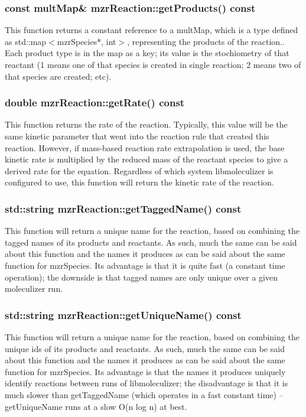 \subsubsection{const multMap\& mzrReaction::getProducts() const}
This function returns a constant reference to a multMap, which is a
type defined as std::map$<$mzrSpecies*, int$>$, representing the products
of the reaction..  Each product type is in
the map as a key; its value is the stochiometry of that reactant (1
means one of that species is created in single reaction; 2 means two
of that species are created; etc).  

\subsubsection{double mzrReaction::getRate() const }
This function returns the rate of the reaction.  Typically, this
value will be the same kinetic parameter that went into the reaction
rule that created this reaction.  However, if mass-based reaction rate
extrapolation is used, the base kinetic rate is multiplied by the
reduced mass of the reactant species to give a derived rate for the
equation.  Regardless of which system libmoleculizer is configured to
use, this function will return the kinetic rate of the reaction.


\subsubsection{std::string mzrReaction::getTaggedName() const}
This function will return a unique name for the reaction, based on
combining the tagged names of its products and reactants.  As such,
much the same can be said about this function and the names it
produces as can be said about the same function for mzrSpecies.  Its
advantage is that it is quite fast (a constant time operation); the
downside is that tagged names are only unique over a given moleculizer
run.  

\subsubsection{std::string mzrReaction::getUniqueName() const}
This function will return a unique name for the reaction, based on
combining the unique ids of its products and reactants.  As such,
much the same can be said about this function and the names it
produces as can be said about the same function for mzrSpecies.  Its
advantage is that the names it produces uniquely identify reactions
between runs of libmoleculizer; the disadvantage is that it is much
slower than getTaggedName (which operates in a fast constant time) --
getUniqueName runs at a slow O(n log n) at best.


